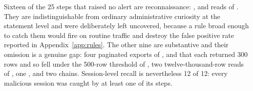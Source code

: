 Sixteen of the \num{25} steps that raised no alert are reconnaissance:
,  and reads of . They
are indistinguishable from ordinary administrative curiosity at the statement level and
were deliberately left uncovered, because a rule broad enough to catch them would fire on
routine traffic and destroy the false positive rate reported in
Appendix~\ref{app:rules}. The other nine are substantive and their omission is a genuine
gap: four paginated exports of ,  and
 that each returned 300 rows and so fell under the 500-row threshold
of , two twelve-thousand-row reads of , one
, and two  chains.
Session-level recall is nevertheless \num{12} of \num{12}: every malicious session was
caught by at least one of its steps.
